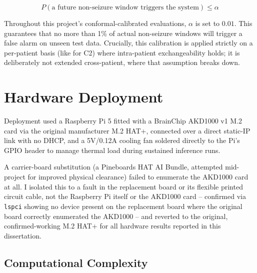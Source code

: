 \begin{equation}
P(\text{a future non-seizure window triggers the system}) \leq \alpha
\end{equation}

Throughout this project's conformal-calibrated evaluations, $\alpha$ is set to $0.01$. This guarantees that no more than 1\% of actual non-seizure windows will trigger a false alarm on unseen test data. Crucially, this calibration is applied strictly on a per-patient basis (like for C2) where intra-patient exchangeability holds; it is deliberately not extended cross-patient, where that assumption breaks down.

\section{Hardware Deployment}

Deployment used a Raspberry Pi 5 fitted with a BrainChip AKD1000 v1 M.2 card via the original manufacturer M.2 HAT+, connected over a direct static-IP link with no DHCP, and a 5V/0.12A cooling fan soldered directly to the Pi's GPIO header to manage thermal load during sustained inference runs.


A carrier-board substitution (a Pineboards HAT AI Bundle, attempted mid-project for improved physical clearance) failed to enumerate the AKD1000 card at all. I isolated this to a fault in the replacement board or its flexible printed circuit cable, not the Raspberry Pi itself or the AKD1000 card -- confirmed via \texttt{lspci} showing no device present on the replacement board where the original board correctly enumerated the AKD1000 -- and reverted to the original, confirmed-working M.2 HAT+ for all hardware results reported in this dissertation.

\subsection{Computational Complexity}
\label{sec:compute-complexity}

